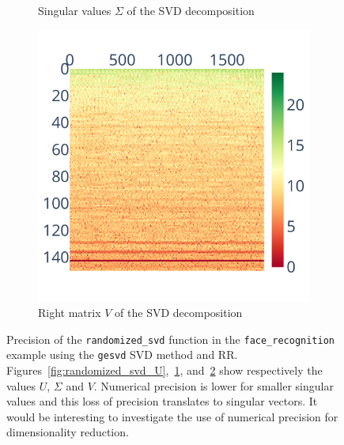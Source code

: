 \documentclass[10pt,journal,compsoc]{IEEEtran}
\begin{document}
\begin{figure}
\begin{subfigure}{0.3\linewidth}
        \caption{Singular values $\Sigma$ of the SVD decomposition}
        \label{fig:randomized_svd_S}
    \end{subfigure}
    \begin{subfigure}{0.3\linewidth}
        \includegraphics[width=\linewidth]{figure/face_recognition/randomized_svd_ret_V_sig.pdf}
        \caption{Right matrix $V$ of the SVD decomposition}
        \label{fig:randomized_svd_V}
    \end{subfigure}
    \caption{Precision of the \texttt{randomized\_svd} function in the
        \texttt{face\_recognition} example using the \texttt{gesvd} SVD method
        and RR. Figures~\ref{fig:randomized_svd_U},~\ref{fig:randomized_svd_S},
        and~\ref{fig:randomized_svd_V} show respectively the values $U$,
        $\Sigma$ and $V$. Numerical precision is lower for smaller singular
        values and this loss of precision translates to singular vectors. It
        would be interesting to investigate the use of numerical precision for
        dimensionality reduction. }
    \label{fig:face_recognition_svd}
\end{figure}
\end{document}
